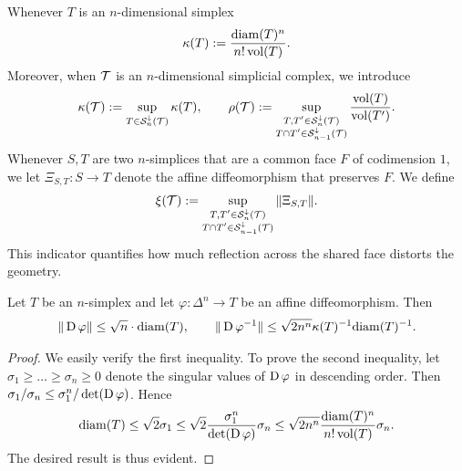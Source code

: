 \documentclass[a4paper]{article}
\begin{document}
Whenever $T$ is an $n$-dimensional simplex 
\begin{align}\label{math:geometricshapemeasure}
    \kappa(T)
    := 
    \frac{ {\operatorname{diam}}(T)^{n} }{ n! \operatorname{vol}(T) }
    .
\end{align}
Moreover, when ${\mathcal T}$ is an $n$-dimensional simplicial complex, we introduce 
\begin{align}\label{math:moremeasures}
    \kappa({\mathcal T}) := \sup_{ T \in {\mathcal S}^{\downarrow}_{n}({\mathcal T}) } \kappa(T),
    \qquad 
    \rho({\mathcal T}) := \sup_{ \substack{ T, T' \in {\mathcal S}^{\downarrow}_{n}({\mathcal T}) \\ T \cap T' \in {\mathcal S}^{\downarrow}_{n-1}({\mathcal T}) } } \frac{ \operatorname{vol}(T) }{ \operatorname{vol}(T') }.
\end{align}
Whenever $S,T$ are two $n$-simplices that are a common face $F$ of codimension $1$, we let $\Xi_{S,T} : S \rightarrow T$ denote the affine diffeomorphism 
that preserves $F$. We define 
\begin{align}\label{math:reflectionmeasure}
    \xi({\mathcal T}) := \sup_{ \substack{ T, T' \in {\mathcal S}^{\downarrow}_{n}({\mathcal T}) \\ T \cap T' \in {\mathcal S}^{\downarrow}_{n-1}({\mathcal T}) } } \| \Xi_{S,T} \|.
\end{align}
This indicator quantifies how much reflection across the shared face distorts the geometry. 




\begin{lemma}\label{lemma:affinetransform}
    Let $T$ be an $n$-simplex and let $\varphi : \Delta^{n} \rightarrow T$ be an affine diffeomorphism. Then 
    \begin{align*}
        \| \operatorname{D} \varphi \|
        \leq 
        \sqrt{n} \cdot {\operatorname{diam}}(T)
        ,
        \qquad 
        \| \operatorname{D} \varphi^{-1} \|
        \leq 
        \sqrt{2n^{n}} 
        \kappa(T)^{-1}
        {\operatorname{diam}}(T)^{-1}
        .
    \end{align*}
\end{lemma}
\begin{proof}
    We easily verify the first inequality. To prove the second inequality, let $\sigma_1 \geq \dots \geq \sigma_n \geq 0$ denote the singular values of $\operatorname{D}\varphi$ in descending order.
    Then $\sigma_1/\sigma_n \leq \sigma_1^{n} / \det(\operatorname{D}\varphi)$. Hence 
    \[
        {\operatorname{diam}}(T) 
        \leq 
        \sqrt{2} \sigma_1 
        \leq 
        \sqrt{2} 
        \frac{ \sigma_1^{n} }{ \det(\operatorname{D}\varphi) } 
        \sigma_n
        \leq 
        \sqrt{2n^{n}} 
        \frac{ {\operatorname{diam}}(T)^{n} }{ n! \operatorname{vol}(T) } 
        \sigma_n
        .
    \]
    The desired result is thus evident. 
\end{proof}
    
\end{document}
